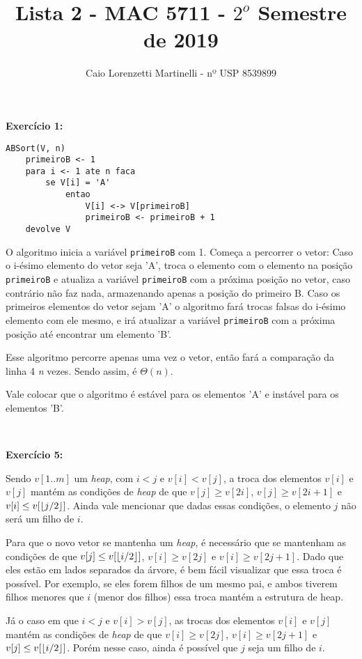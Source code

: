 \documentclass{article}
\author{
	Caio Lorenzetti Martinelli - nº USP 8539899
}
\title{Lista 2 - MAC 5711 - $2^o$ Semestre de 2019}
\DeclarePairedDelimiter\floor{\lfloor}{\rfloor}
\begin{document}
\maketitle

\textbf{Exercício 1:}

\begin{lstlisting}[style=Pseudo]
ABSort(V, n)
	primeiroB <- 1
	para i <- 1 ate n faca
		se V[i] = 'A'
			entao 
				V[i] <-> V[primeiroB]
				primeiroB <- primeiroB + 1
	devolve V			
\end{lstlisting}

O algoritmo inicia a variável \texttt{primeiroB} com 1. Começa a percorrer o vetor: Caso o i-ésimo elemento do vetor seja 'A', troca o elemento com o elemento na posição \texttt{primeiroB} e atualiza a variável \texttt{primeiroB} com a próxima posição no vetor, caso contrário não faz nada, armazenando apenas a posição do primeiro B.
Caso os primeiros elementos do vetor sejam 'A' o algoritmo fará trocas falsas do i-ésimo elemento com ele mesmo, e irá atualizar a variável \texttt{primeiroB} com a próxima posição até encontrar um elemento 'B'. 

Esse algoritmo percorre apenas uma vez o vetor, então fará a comparação da linha 4 \textit{n} vezes. Sendo assim, é $\Theta(n)$.

Vale colocar que o algoritmo é estável para os elementos 'A' e instável para os elementos 'B'.

\

\textbf{Exercício 5:}

Sendo $v[1..m]$ um \textit{heap}, com $i < j$ e $v[i] < v[j]$, a troca dos elementos $v[i]$ e $v[j]$ mantém as condições de \textit{heap} de que $v[j] \geq v[2i]$, $v[j] \geq v[2i+1]$ e $v[i] \leq v[\floor*{j/2}]$. Ainda vale mencionar que dadas essas condições, o elemento $j$ não será um filho de $i$.

Para que o novo vetor se mantenha um \textit{heap}, é necessário que se mantenham as condições de que $v[j] \leq v[\floor*{i/2}]$, $v[i] \geq v[2j]$ e $v[i] \geq v[2j + 1]$. Dado que eles estão em lados separados da árvore, é bem fácil visualizar que essa troca é possível. Por exemplo, se eles forem filhos de um mesmo pai, e ambos tiverem filhos menores que $i$ (menor dos filhos) essa troca mantém a estrutura de heap.

Já o caso em que $i < j$ e $v[i] > v[j]$, as trocas dos elementos $v[i]$ e $v[j]$ mantém as condições de \textit{heap} de que $v[i] \geq v[2j]$, $v[i] \geq v[2j+1]$ e $v[j] \leq v[\floor*{i/2}]$. Porém nesse caso, ainda é possível que $j$ seja um filho de $i$.
\end{document}
